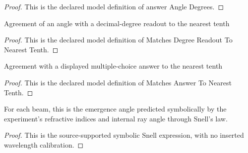\begin{proof}
  This is the declared model definition of answer Angle Degrees.
\end{proof}
\begin{definition}
  \label{def:physics:phyx-mini-0150:phyxminiproblems-problemphyxmini0150-matchesdegreereadouttonearesttenth}
  Agreement of an angle with a decimal-degree readout to the nearest tenth
\end{definition}
\begin{proof}
  This is the declared model definition of Matches Degree Readout To Nearest Tenth.
\end{proof}
\begin{definition}
  \label{def:physics:phyx-mini-0150:phyxminiproblems-problemphyxmini0150-matchesanswertonearesttenth}
  Agreement with a displayed multiple-choice answer to the nearest tenth
\end{definition}
\begin{proof}
  This is the declared model definition of Matches Answer To Nearest Tenth.
\end{proof}
\begin{definition}
  \label{def:physics:phyx-mini-0150:phyxminiproblems-problemphyxmini0150-snellpredictedemergenceradians}
  For each beam, this is the emergence angle predicted symbolically by the experiment's refractive indices and internal ray angle through Snell's law.
\end{definition}
\begin{proof}
  This is the source-supported symbolic Snell expression, with no inserted wavelength calibration.
\end{proof}
